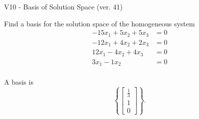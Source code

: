 \begin{exercise}
  \begin{exerciseTitle}V10 - Basis of Solution Space (ver. 41)\end{exerciseTitle}
  \begin{exerciseStatement}
    Find a basis for the solution space of the homogeneous system 
\begin{align*}
 -15 x_ 1 + 5 x_ 2 + 5 x_ 3 &= 0  \\ 
  -12 x_ 1 + 4 x_ 2 + 2 x_ 3 &= 0  \\ 
  12 x_ 1 -4 x_ 2 + 4 x_ 3 &= 0  \\ 
  3 x_ 1 -1 x_ 2 &= 0  \\ 
 \end{align*}


 
  \end{exerciseStatement}

  \begin{exerciseAnswer}
   A basis is   
\[\left\{\left[\begin{array}{c}
\frac{1}{3} \\
1 \\
0
\end{array}\right]\right\}.\]

  


  \end{exerciseAnswer}
\end{exercise}
